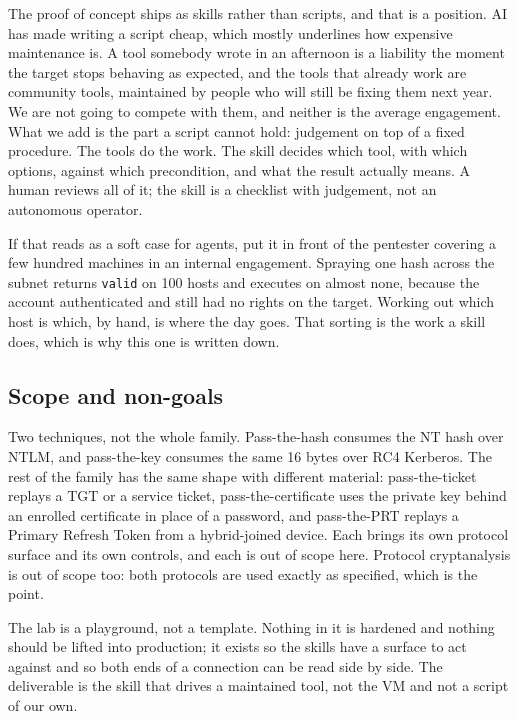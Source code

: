 The proof of concept ships as skills rather than scripts, and that is a position. AI has made
writing a script cheap, which mostly underlines how expensive maintenance is. A tool somebody
wrote in an afternoon is a liability the moment the target stops behaving as expected, and the
tools that already work are community tools, maintained by people who will still be fixing them
next year. We are not going to compete with them, and neither is the average engagement. What we
add is the part a script cannot hold: judgement on top of a fixed procedure. The tools do the
work. The skill decides which tool, with which options, against which precondition, and what the
result actually means. A human reviews all of it; the skill is a checklist with judgement, not an
autonomous operator.

If that reads as a soft case for agents, put it in front of the pentester covering a few hundred
machines in an internal engagement. Spraying one hash across the subnet returns \texttt{valid} on
100 hosts and executes on almost none, because the account authenticated and still had no
rights on the target. Working out which host is which, by hand, is where the day goes. That
sorting is the work a skill does, which is why this one is written down.

\subsection{Scope and non-goals}
\label{sec:scope}

Two techniques, not the whole family. Pass-the-hash consumes the NT hash over NTLM, and
pass-the-key consumes the same 16 bytes over RC4 Kerberos. The rest of the family has the
same shape with different material: pass-the-ticket replays a TGT or a service ticket,
pass-the-certificate uses the private key behind an enrolled certificate in place of a password,
and pass-the-PRT replays a Primary Refresh Token from a hybrid-joined device. Each brings its own
protocol surface and its own controls, and each is out of scope here. Protocol cryptanalysis is
out of scope too: both protocols are used exactly as specified, which is the point.

The lab is a playground, not a template. Nothing in it is hardened and nothing should be lifted
into production; it exists so the skills have a surface to act against and so both ends of a
connection can be read side by side. The deliverable is the skill that drives a maintained tool,
not the VM and not a script of our own.

